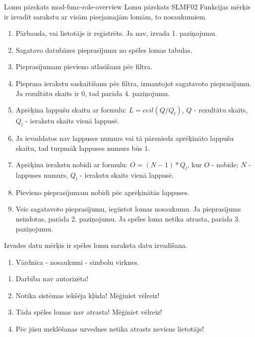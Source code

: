 \moduleFunctionTable
{Lomu pārskats}
{mod-func-role-overview}
{Lomu pārskats}
{SLMF02}
{
	Funkcijas mērķis ir izvadīt sarakstu ar visām pieejamajām lomām, to nosaukumiem.
}
{
}
{
	\begin{enumerate}
		\item Pārbauda, vai lietotājs ir reģistrēts. Ja nav, izvada 1. paziņojumu.
		\item Sagatavo datubāzes pieprasījumu no spēles lomas tabulas.
		\item Pieprasījumam pievieno atlasīšanu pēc filtra.
		\item Pieprasa ierakstu saskaitīšanu pēc filtra, izmantojot sagatavoto pieprasījumu.
		      Ja rezultātu skaits ir $0$, tad parāda 4. paziņojumu.
		\item Aprēķina lappušu skaitu ar formulu: $L = ceil(Q / Q_l)$, $Q$ - rezultātu skaits, $Q_l$ - ierakstu skaits vienā lappusē.
		\item Ja ievaddatos nav lappuses numurs vai tā pārsniedz aprēķināto lappušu skaitu, tad turpmāk lappuses numurs būs 1.
		\item Aprēķina ierakstu nobīdi ar formulu: $O = (N - 1) * Q_l$, kur $O$ - nobīde; $N$ - lappuses numurs, $Q_l$ - ierakstu skaits vienā lappusē.
		\item Pievieno pieprasījumam nobīdi pēc aprēķinātās lappuses.
		\item Veic sagatavoto pieprasījumu, iegūstot lomas nosaukumu. Ja pieprasījums neizdotas, parāda 2. paziņojumu. Ja spēles loma netika atrasta, parāda 3. paziņojumu.
	\end{enumerate}
}
{
	Izvades datu mērķis ir spēles lomu saraksta datu izvadīšana.
	\begin{enumerate}
		\item Vārdnīca - nosaukumi - simbolu virknes.
	\end{enumerate}
}
{
	\begin{enumerate}
		\item Darbība nav autorizēta!
		\item Notika sistēmas iekšēja kļūda! Mēģiniet vēlreiz!
		\item Tāda spēles lomas nav atrasta! Mēģiniet vēlreiz!
		\item Pēc jūsu meklēšanas uzvednes netika atrasts neviens lietotājs!
	\end{enumerate}
}
